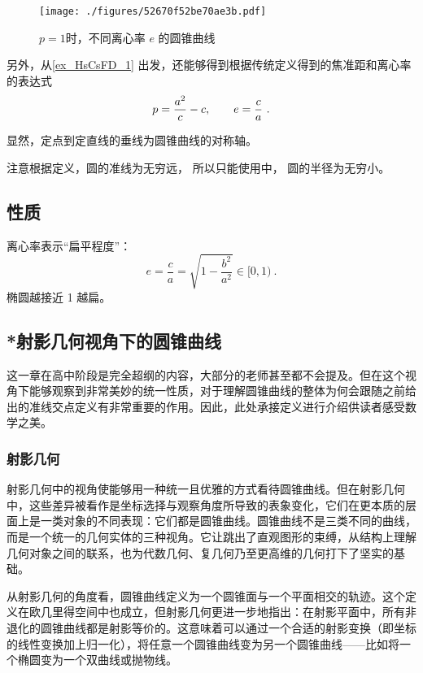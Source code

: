 \begin{figure}[ht]
\centering
\texttt{[image: ./figures/52670f52be70ae3b.pdf]}
\caption{$p = 1$时，不同离心率 $e$ 的圆锥曲线} \label{fig_Cone_2}
\end{figure}


另外，从\autoref{ex_HsCsFD_1} 出发，还能够得到根据传统定义得到的焦准距和离心率的表达式
\begin{equation}
p={a^2\over c}-c,\qquad e={c\over a}~.
\end{equation}


显然，定点到定直线的垂线为圆锥曲线的对称轴。

注意根据定义，圆的准线为无穷远， 所以只能使用中， 圆的半径为无穷小。
\subsection{性质}

离心率表示“扁平程度”：
$$ e = \frac{c}{a} = \sqrt{1 - \frac{b^2}{a^2}} \in [0, 1) ~.$$
椭圆越接近 1 越扁。

\subsection{*射影几何视角下的圆锥曲线}\label{sub_HsCsFD_1}

这一章在高中阶段是完全超纲的内容，大部分的老师甚至都不会提及。但在这个视角下能够观察到非常美妙的统一性质，对于理解圆锥曲线的整体为何会跟随之前给出的准线交点定义有非常重要的作用。因此，此处承接定义进行介绍供读者感受数学之美。


\subsubsection{射影几何}



射影几何中的视角使能够用一种统一且优雅的方式看待圆锥曲线。但在射影几何中，这些差异被看作是坐标选择与观察角度所导致的表象变化，它们在更本质的层面上是一类对象的不同表现：它们都是圆锥曲线。圆锥曲线不是三类不同的曲线，而是一个统一的几何实体的三种视角。它让跳出了直观图形的束缚，从结构上理解几何对象之间的联系，也为代数几何、复几何乃至更高维的几何打下了坚实的基础。

从射影几何的角度看，圆锥曲线定义为一个圆锥面与一个平面相交的轨迹。这个定义在欧几里得空间中也成立，但射影几何更进一步地指出：在射影平面中，所有非退化的圆锥曲线都是射影等价的。这意味着可以通过一个合适的射影变换（即坐标的线性变换加上归一化），将任意一个圆锥曲线变为另一个圆锥曲线——比如将一个椭圆变为一个双曲线或抛物线。

